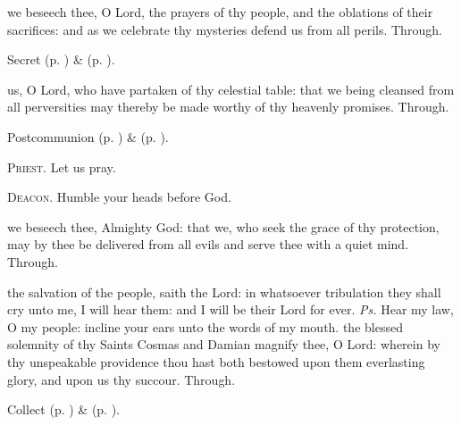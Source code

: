 
\vspace{-0.5\baselineskip}

\secret

\vspace{-0.25\baselineskip}

 we beseech thee, O Lord, the prayers of thy people, and the oblations of their sacrifices: and as we celebrate thy mysteries defend us from all perils. Through.
\begin{rubric}
     Secret  (p. \pageref{AshWednesdayMassSecret}) \&   (p. \pageref{SPLivingDeparted}).
\end{rubric}


\vspace{-0.5\baselineskip}

\postcommunion

\vspace{-0.25\baselineskip}

 us, O Lord, who have partaken of thy celestial table: that we being cleansed from all perversities may thereby be made worthy of thy heavenly promises. Through.
\begin{rubric}
     Postcommunion  (p. \pageref{AshWednesdayMassPostcommunion}) \&   (p. \pageref{SPLivingDeparted}).
\end{rubric}

\textsc{Priest.} Let us pray.\par
\textsc{Deacon.} Humble your heads before God.\par
{} we beseech thee, Almighty God: that we, who seek the grace of thy protection, may by thee be delivered from all evils and serve thee with a quiet mind. Through.


\clearpage
{}
\introit
{} the salvation of the people, saith the Lord: in whatsoever tribulation they shall cry unto me, I will hear them: and I will be their Lord for ever. \textit{Ps.} Hear my law, O my people: incline your ears unto the words of my mouth.
\collect
{} the blessed solemnity of thy Saints Cosmas and Damian magnify thee, O Lord: wherein by thy unspeakable providence thou hast both bestowed upon them everlasting glory, and upon us thy succour. Through.
\begin{rubric}
     Collect  (p. \pageref{AshWednesdayMassCollect}) \&   (p. \pageref{SPLivingDeparted}).
\end{rubric}


